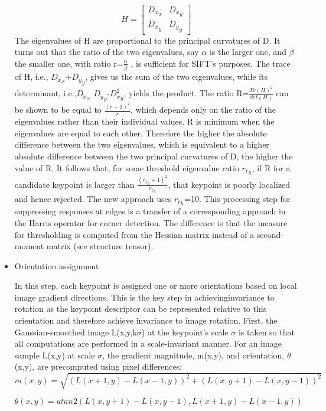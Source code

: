 \documentclass[12pt]{article}
\begin{document}
\begin{itemize}
$$H=\begin{bmatrix}
	{D_x}_x& {D_x}_y\\
	{D_x}_y& {D_y}_y
\end{bmatrix}$$
	The eigenvalues of H are proportional to the principal curvatures of D. It turns out that the ratio of the two eigenvalues, say $\alpha$ is the larger one, and $\beta$ the smaller one, with ratio r=$\frac{\alpha}{\beta}$ , is sufficient for SIFT's purposes. The trace of H, i.e., ${D_x}_x$+${D_y}_y$, gives us the sum of the two eigenvalues, while its determinant, i.e.,${D_x}_x$ ${D_y}_y$-${D^2_x}_y$, yields the product. The ratio R=$\frac{Tr(H)^2}{det(H)}$ can be shown to be equal to $\frac{(r+1)^2}{r}$, which depends only on the ratio of the eigenvalues rather than their individual values. R is minimum when the eigenvalues are equal to each other. Therefore the higher the absolute difference between the two eigenvalues, which is equivalent to a higher absolute difference between the two principal curvatures of D, the higher the value of R. It follows that, for some threshold eigenvalue ratio ${r_t}_h$, if R for a candidate keypoint is larger than  $\frac{({r_t}_h+1)^2}{{r_t}_h}$, that keypoint is poorly localized and hence rejected. The new approach uses ${r_t}_h$=10.
This processing step for suppressing responses at edges is a transfer of a corresponding approach in the Harris operator for corner detection. The difference is that the measure for thresholding is computed from the Hessian matrix instead of a second-moment matrix (see structure tensor).

	\item Orientation assignment
	
	In this step, each keypoint is assigned one or more orientations based on local image gradient directions. This is the key step in achievinginvariance to rotation as the keypoint descriptor can be represented relative to this orientation and therefore achieve invariance to image rotation.
First, the Gaussian-smoothed image L(x,y,k$\sigma$) at the keypoint's scale $\sigma$ is taken so that all computations are performed in a scale-invariant manner. For an image sample L(x,y) at scale $\sigma$, the gradient magnitude, m(x,y), and orientation, $\theta$(x,y), are precomputed using pixel differences:
\begin{equation}
m(x,y)=\sqrt{(L(x+1,y)-L(x-1,y))^2+(L(x,y+1)-L(x,y-1))^2}
\end{equation}

\begin{equation}
\theta(x,y)=atan2(L(x,y+1)-L(x,y-1),L(x+1,y)-L(x-1,y))
\end{equation}


\end{itemize}
\end{document}
